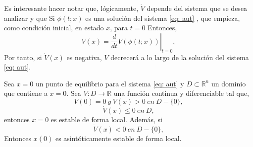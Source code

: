 Es interesante hacer notar que, lógicamente, $\dot V$ depende del sistema que se desea analizar y que Si $\phi(t;x)$ es una solución del sistema \ref{eq: aut} , que empieza, como condición inicial, en estado $x$, para $t=0$ Entonces,
\begin{equation}
\dot V(x) =\left. \frac{d}{dt}V(\phi (t;x))\right|_{t=0},
\end{equation}
Por tanto, si $\dot V(x)$ es negativa, $V$ decrecerá a lo largo de la solución del sistema \ref{eq: aut}.

\begin{theorem}\label{th: lyap1}
Sea $x=0$ un punto de equilibrio para el sistema \ref{eq: aut} y $D \subset \mathbb{R}^n$ un dominio que contiene a $x=0$. Sea $V:D 	\to \mathbb{R}$ una función continua y diferenciable tal que,
\begin{equation}\label{eq: lyap1}
V(0) = 0\ y\ V(x) > 0\ en\  D-\{0\},
\end{equation}
\begin{equation}\label{eq: lyap2}
\dot V(x) \leq 0\ en\ D,
\end{equation} 
entonces $x=0$ es estable de forma local. Además, si
\begin{equation}\label{eq: lyap3}
\dot V(x) < 0 \ en\ D-\{0\},
\end{equation} 
Entonces $x(0)$ es asintóticamente estable de forma local.
\end{theorem}
